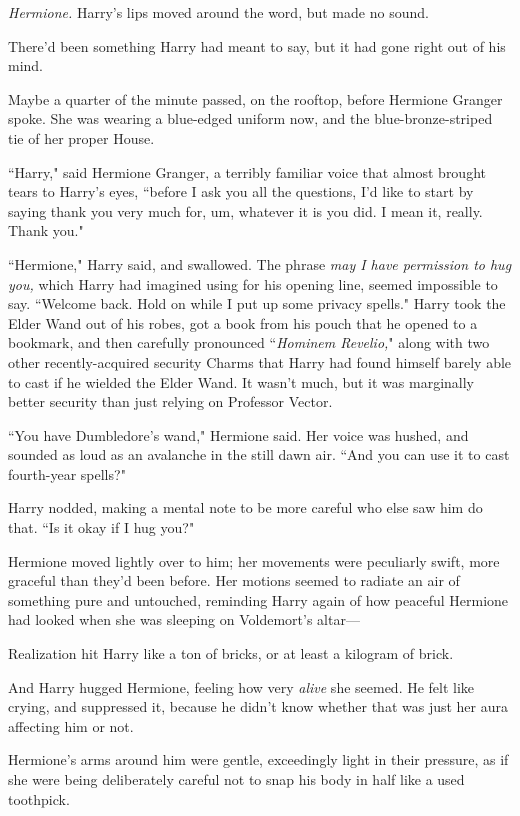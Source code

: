 \emph{Hermione.} Harry's lips moved around the word, but made no sound.

There'd been something Harry had meant to say, but it had gone right out of his mind.

Maybe a quarter of the minute passed, on the rooftop, before Hermione Granger spoke. She was wearing a blue-edged uniform now, and the blue-bronze-striped tie of her proper House.

``Harry," said Hermione Granger, a terribly familiar voice that almost brought tears to Harry's eyes, ``before I ask you all the questions, I'd like to start by saying thank you very much for, um, whatever it is you did. I mean it, really. Thank you."

``Hermione," Harry said, and swallowed. The phrase \emph{may I have permission to hug you,} which Harry had imagined using for his opening line, seemed impossible to say. ``Welcome back. Hold on while I put up some privacy spells." Harry took the Elder Wand out of his robes, got a book from his pouch that he opened to a bookmark, and then carefully pronounced ``\emph{Hominem Revelio,}" along with two other recently-acquired security Charms that Harry had found himself barely able to cast if he wielded the Elder Wand. It wasn't much, but it was marginally better security than just relying on Professor Vector.

``You have Dumbledore's wand," Hermione said. Her voice was hushed, and sounded as loud as an avalanche in the still dawn air. ``And you can use it to cast fourth-year spells?"

Harry nodded, making a mental note to be more careful who else saw him do that. ``Is it okay if I hug you?"

Hermione moved lightly over to him; her movements were peculiarly swift, more graceful than they'd been before. Her motions seemed to radiate an air of something pure and untouched, reminding Harry again of how peaceful Hermione had looked when she was sleeping on Voldemort's altar—

Realization hit Harry like a ton of bricks, or at least a kilogram of brick.

And Harry hugged Hermione, feeling how very \emph{alive} she seemed. He felt like crying, and suppressed it, because he didn't know whether that was just her aura affecting him or not.

Hermione's arms around him were gentle, exceedingly light in their pressure, as if she were being deliberately careful not to snap his body in half like a used toothpick.

